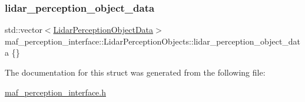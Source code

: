 \mbox{\label{structmaf__perception__interface_1_1LidarPerceptionObjects_aed684e6b8c9eca6434a9caf04b4a7106}} 
\subsubsection{\texorpdfstring{lidar\+\_\+perception\+\_\+object\+\_\+data}{lidar\_perception\_object\_data}}
{\footnotesize\ttfamily std\+::vector$<$\hyperlink{structmaf__perception__interface_1_1LidarPerceptionObjectData}{Lidar\+Perception\+Object\+Data}$>$ maf\+\_\+perception\+\_\+interface\+::\+Lidar\+Perception\+Objects\+::lidar\+\_\+perception\+\_\+object\+\_\+data \{\}}



The documentation for this struct was generated from the following file\+:\begin{DoxyCompactItemize}
\item 
\hyperlink{maf__perception__interface_8h}{maf\+\_\+perception\+\_\+interface.\+h}\end{DoxyCompactItemize}
